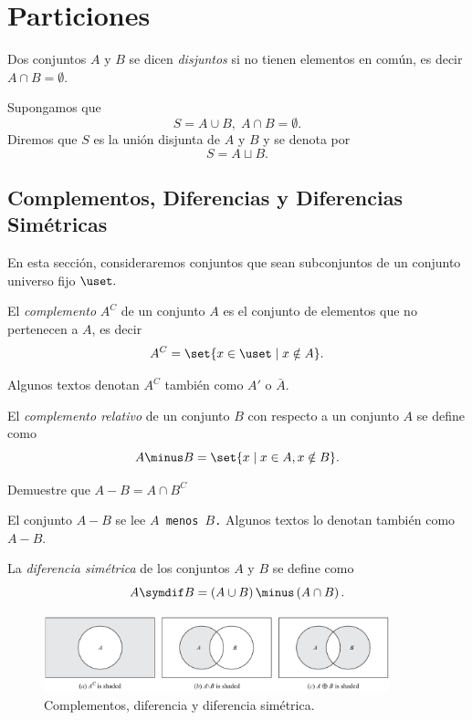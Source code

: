 \section{Particiones}

Dos conjuntos $A$ y $B$ se dicen \emph{disjuntos} si no tienen elementos en común, es decir $A\cap B=\emptyset$.


Supongamos que 
$$
S=A\cup B, \; A\cap B=\emptyset.
$$  Diremos que $S$ es la unión disjunta de $A$ y $B$ y se denota por $$S=A \sqcup B.$$ 



\subsection{Complementos, Diferencias y Diferencias Sim\'etricas}


En esta sección, consideraremos conjuntos que sean subconjuntos de un conjunto universo fijo $\uset.$



El \emph{complemento} $A^{C}$ de un conjunto $A$ es el conjunto de elementos que no pertenecen a $A$, es decir 
$$A^{C}=\set{x\in \uset \mid x \notin A}.$$



Algunos textos denotan $A^{C}$ tambi\'en como $A'$ o $\bar{A}.$ 



El \emph{complemento relativo} de un conjunto $B$ con respecto a un conjunto $A$ se define como 
$$
A\minus B = \set{x \mid x \in A, x \notin B}.
$$



\begin{ejemplo}
	Demuestre que 
	$A \minus B = A \cap B^{C}$
\end{ejemplo}





El conjunto $A\minus B$ se lee \texttt{$A$ menos $B$.} Algunos textos lo denotan tambi\'en como $A-B.$  



La \emph{diferencia sim\'etrica} de los conjuntos $A$ y $B$ se define como $$A\symdif B=\left( A\cup B \right)\minus \left( A \cap B \right).$$



\begin{figure}
	\centering
	\includegraphics[width=10cm,keepaspectratio=true]{./md/venn_complemento.png}
	\caption{Complementos, diferencia y diferencia simétrica.}
	\label{fig:0104}
\end{figure}






